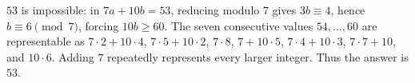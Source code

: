 $53$ is impossible: in $7a+10b=53$, reducing modulo $7$ gives $3b\equiv4$, hence $b\equiv6\pmod7$, forcing $10b\ge60$. The seven consecutive values $54,\ldots,60$ are representable as $7\cdot2+10\cdot4$, $7\cdot5+10\cdot2$, $7\cdot8$, $7+10\cdot5$, $7\cdot4+10\cdot3$, $7\cdot7+10$, and $10\cdot6$. Adding $7$ repeatedly represents every larger integer. Thus the answer is $\boxed{53}$.
